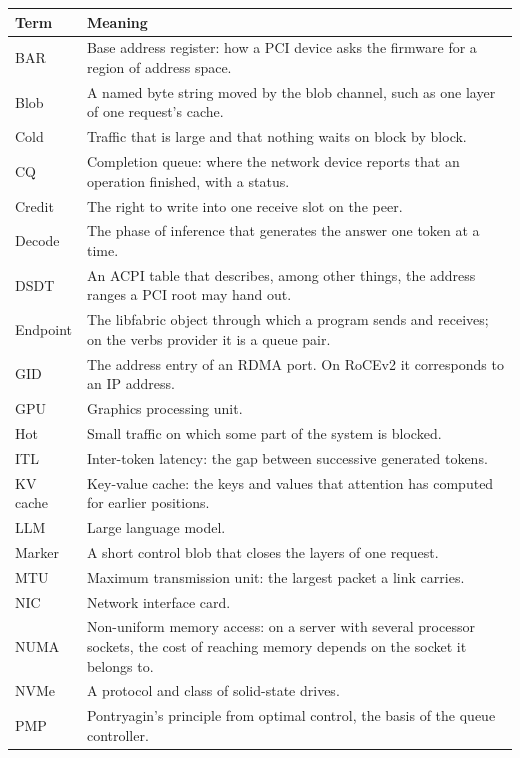 \begin{tightblock}
\begin{longtable}{L{3.3cm}L{11.2cm}}
  \toprule
  Term & Meaning \\
  \midrule
  \endhead
  BAR & Base address register: how a PCI device asks the firmware for a region of address space. \\
  Blob & A named byte string moved by the blob channel, such as one layer of one request's cache. \\
  Cold & Traffic that is large and that nothing waits on block by block. \\
  CQ & Completion queue: where the network device reports that an operation finished, with a status. \\
  Credit & The right to write into one receive slot on the peer. \\
  Decode & The phase of inference that generates the answer one token at a time. \\
  DSDT & An ACPI table that describes, among other things, the address ranges a PCI root may hand out. \\
  Endpoint & The libfabric object through which a program sends and receives; on the verbs provider it is a queue pair. \\
  GID & The address entry of an RDMA port. On RoCEv2 it corresponds to an IP address. \\
  GPU & Graphics processing unit. \\
  Hot & Small traffic on which some part of the system is blocked. \\
  ITL & Inter-token latency: the gap between successive generated tokens. \\
  KV cache & Key-value cache: the keys and values that attention has computed for earlier positions. \\
  LLM & Large language model. \\
  Marker & A short control blob that closes the layers of one request. \\
  MTU & Maximum transmission unit: the largest packet a link carries. \\
  NIC & Network interface card. \\
  NUMA & Non-uniform memory access: on a server with several processor sockets, the cost of reaching memory depends on the socket it belongs to. \\
  NVMe & A protocol and class of solid-state drives. \\
  PMP & Pontryagin's principle from optimal control, the basis of the queue controller. \\

\end{longtable}
\end{tightblock}
